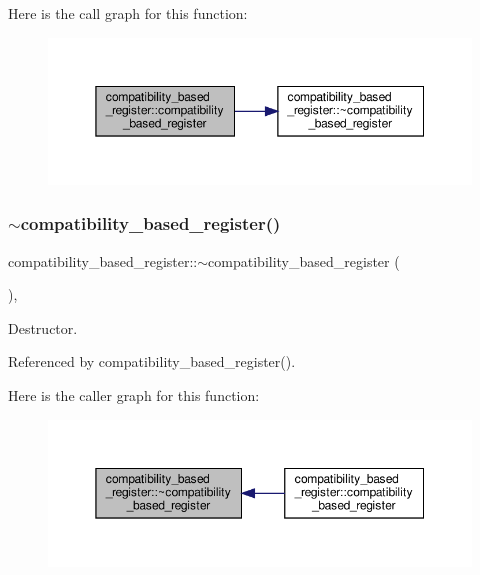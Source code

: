 Here is the call graph for this function\+:
\nopagebreak
\begin{figure}[H]
\begin{center}
\leavevmode
\includegraphics[width=350pt]{d0/d1b/classcompatibility__based__register_ae7bf29c0536a7a36c144258b953d8660_cgraph}
\end{center}
\end{figure}
\mbox{\label{classcompatibility__based__register_a7b452ff93b003cd5988c2dae51bf3077}} 
\subsubsection{\texorpdfstring{$\sim$compatibility\+\_\+based\+\_\+register()}{~compatibility\_based\_register()}}
{\footnotesize\ttfamily compatibility\+\_\+based\+\_\+register\+::$\sim$compatibility\+\_\+based\+\_\+register (\begin{DoxyParamCaption}{ }\end{DoxyParamCaption})\hspace{0.3cm}{\ttfamily [override]}, {\ttfamily [default]}}



Destructor. 



Referenced by compatibility\+\_\+based\+\_\+register().

Here is the caller graph for this function\+:
\nopagebreak
\begin{figure}[H]
\begin{center}
\leavevmode
\includegraphics[width=350pt]{d0/d1b/classcompatibility__based__register_a7b452ff93b003cd5988c2dae51bf3077_icgraph}
\end{center}
\end{figure}


